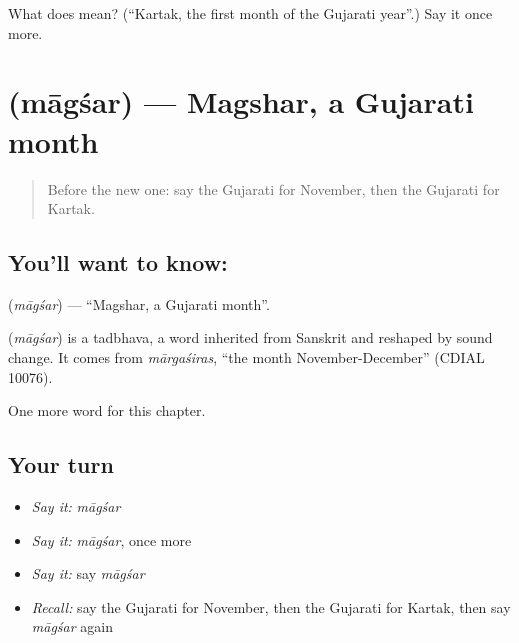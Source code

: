 \begin{tcolorbox}[breakable,colback=teal!4,colframe=teal!35!black,title={Before you move on}]
What does  mean? (\textquotedblleft{}Kartak, the first month of the Gujarati year\textquotedblright{}.) Say it once more.
\end{tcolorbox}
\section[\texorpdfstring{\gu{માગશર} (māgśar)}{માગશર (māgśar)}]{ (māgśar) — Magshar, a Gujarati month}

\label{lesson:GU-C97-magsar}



\begin{quote}
Before the new one: say the Gujarati for November, then the Gujarati for Kartak.
\end{quote}

\subsection*{You'll want to know: }
\textbf{} (\emph{māgśar}) — \textquotedblleft{}Magshar, a Gujarati month\textquotedblright{}.

\begin{cousinweb}
\textbf{} (\emph{māgśar}) is a tadbhava, a word inherited from Sanskrit and reshaped by sound change. It comes from \emph{mārgaśiras}, \textquotedblleft{}the month November-December\textquotedblright{} (CDIAL 10076).
\end{cousinweb}

\begin{grammarlens}[title={What you've built}]
One more word for this chapter.
\end{grammarlens}

\subsection*{Your turn}
\begin{itemize}
\raggedright
  \item \emph{Say it:} \emph{māgśar}
  \item \emph{Say it:} \emph{māgśar}, once more
  \item \emph{Say it:} say \emph{māgśar}
  \item \emph{Recall:} say the Gujarati for November, then the Gujarati for Kartak, then say \emph{māgśar} again
\end{itemize}

